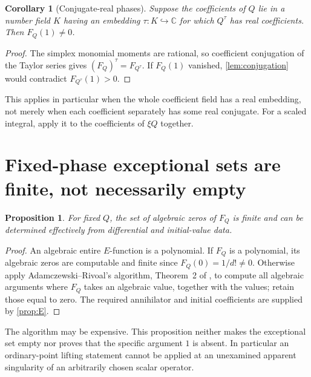 \documentclass[11pt]{article}
\numberwithin{equation}{section}
\newtheorem{proposition}[proposition]{Proposition}
\newtheorem{corollary}[corollary]{Corollary}
\theoremstyle{definition}
\theoremstyle{remark}
\newcommand{\C}{\mathbb C}
\begin{document}
\begin{corollary}[Conjugate-real phases]\label{cor:real}
Suppose the coefficients of $Q$ lie in a number field $K$ having an
embedding $\tau:K\hookrightarrow\C$ for which $Q^\tau$ has real
coefficients. Then $F_Q(1)\ne0$.
\end{corollary}
\begin{proof}
The simplex monomial moments are rational, so coefficient conjugation of
the Taylor series gives $(F_Q)^\tau=F_{Q^\tau}$.
If $F_Q(1)$ vanished, \cref{lem:conjugation} would contradict
$F_{Q^\tau}(1)>0$.
\end{proof}
This applies in particular when the whole coefficient field has a real
embedding, not merely when each coefficient separately has some real
conjugate. For a scaled integral, apply it to the coefficients of $\xi Q$
together.

\section{Fixed-phase exceptional sets are finite, not necessarily empty}
\begin{proposition}\label{prop:exceptional}
For fixed $Q$, the set of algebraic zeros of $F_Q$ is finite and can be
determined effectively from differential and initial-value data.
\end{proposition}
\begin{proof}
An algebraic entire $E$-function is a polynomial. If $F_Q$ is a polynomial,
its algebraic zeros are computable and finite since $F_Q(0)=1/d!\ne0$.
Otherwise apply Adamczewski--Rivoal's algorithm, Theorem~2 of \cite{AR},
to compute all algebraic arguments where $F_Q$ takes an algebraic value,
together with the values; retain those equal to zero. The required
annihilator and initial coefficients are supplied by \cref{prop:E}.
\end{proof}
The algorithm may be expensive. This proposition neither makes the
exceptional set empty nor proves that the specific argument $1$ is absent.
In particular an ordinary-point lifting statement cannot be applied at an
unexamined apparent singularity of an arbitrarily chosen scalar operator.
\end{document}
